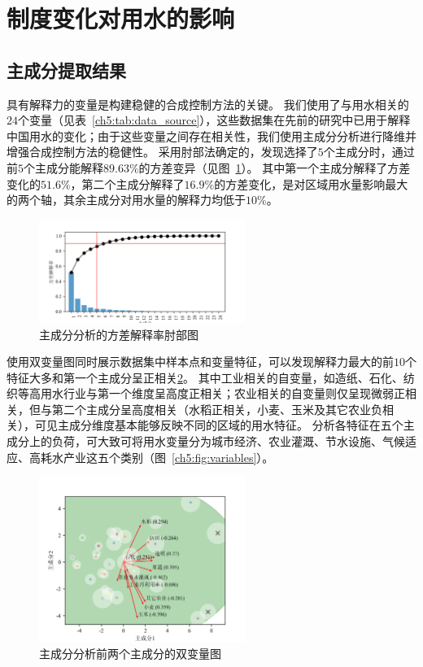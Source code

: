

\section{制度变化对用水的影响}

\subsection{主成分提取结果}

具有解释力的变量是构建稳健的合成控制方法的关键。
我们使用了与用水相关的$24$个变量（见表~\ref{ch5:tab:data_source}），这些数据集在先前的研究中已用于解释中国用水的变化\cite{zhou2020}；由于这些变量之间存在相关性，我们使用主成分分析进行降维并增强合成控制方法的稳健性。
采用肘部法确定的，发现选择了$5$个主成分时，通过前$5$个主成分能解释$89.63\%$的方差变异（见图~\ref{ch5:fig:elbow}）。
其中第一个主成分解释了方差变化的$51.6\%$，第二个主成分解释了$16.9\%$的方差变化，是对区域用水量影响最大的两个轴，其余主成分对用水量的解释力均低于$10\%$。

\begin{figure}[htb]
    \centering
    \includegraphics[width=0.6\textwidth]{img/ch5/ch5_elbow.png}
    \caption{主成分分析的方差解释率肘部图}\label{ch5:fig:elbow}
\end{figure}

使用双变量图同时展示数据集中样本点和变量特征，可以发现解释力最大的前$10$个特征大多和第一个主成分呈正相关\ref{ch5:fig:biplot}。
其中工业相关的自变量，如造纸、石化、纺织等高用水行业与第一个维度呈高度正相关；农业相关的自变量则仅呈现微弱正相关，但与第二个主成分呈高度相关（水稻正相关，小麦、玉米及其它农业负相关），可见主成分维度基本能够反映不同的区域的用水特征。
分析各特征在五个主成分上的负荷，可大致可将用水变量分为城市经济、农业灌溉、节水设施、气候适应、高耗水产业这五个类别（图~\ref{ch5:fig:variables}）。


\begin{figure}[htb]
    \centering
    \includegraphics[width=0.6\textwidth]{img/ch5/ch5_biplot.png}
    \caption{主成分分析前两个主成分的双变量图}\label{ch5:fig:biplot}
\end{figure}



